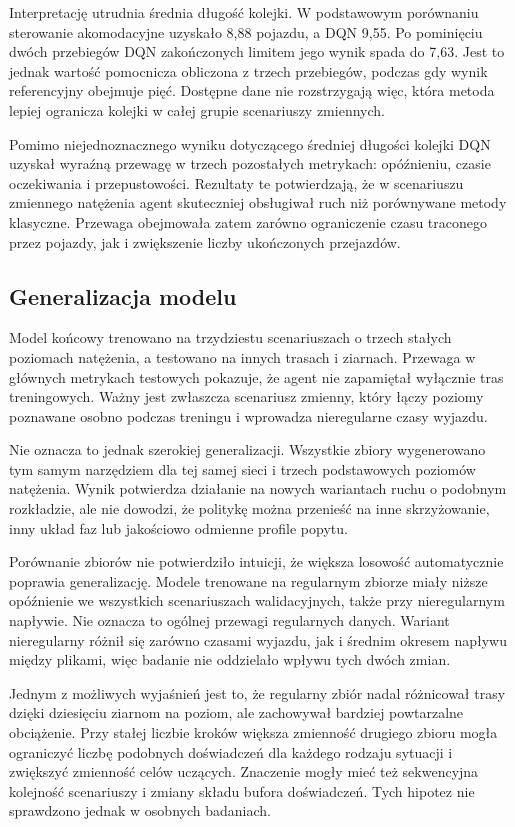Interpretację utrudnia średnia długość kolejki. W podstawowym porównaniu sterowanie akomodacyjne uzyskało 8,88 pojazdu, a DQN 9,55. Po pominięciu dwóch przebiegów DQN zakończonych limitem jego wynik spada do 7,63. Jest to jednak wartość pomocnicza obliczona z trzech przebiegów, podczas gdy wynik referencyjny obejmuje pięć. Dostępne dane nie rozstrzygają więc, która metoda lepiej ogranicza kolejki w całej grupie scenariuszy zmiennych.

Pomimo niejednoznacznego wyniku dotyczącego średniej długości kolejki DQN uzyskał wyraźną przewagę w trzech pozostałych metrykach: opóźnieniu, czasie oczekiwania i przepustowości. Rezultaty te potwierdzają, że w scenariuszu zmiennego natężenia agent skuteczniej obsługiwał ruch niż porównywane metody klasyczne. Przewaga obejmowała zatem zarówno ograniczenie czasu traconego przez pojazdy, jak i zwiększenie liczby ukończonych przejazdów.

\subsection{Generalizacja modelu}
\label{subsec:analiza-generalizacji}

Model końcowy trenowano na trzydziestu scenariuszach o trzech stałych poziomach natężenia, a testowano na innych trasach i ziarnach. Przewaga w głównych metrykach testowych pokazuje, że agent nie zapamiętał wyłącznie tras treningowych. Ważny jest zwłaszcza scenariusz zmienny, który łączy poziomy poznawane osobno podczas treningu i wprowadza nieregularne czasy wyjazdu.

Nie oznacza to jednak szerokiej generalizacji. Wszystkie zbiory wygenerowano tym samym narzędziem dla tej samej sieci i trzech podstawowych poziomów natężenia. Wynik potwierdza działanie na nowych wariantach ruchu o podobnym rozkładzie, ale nie dowodzi, że politykę można przenieść na inne skrzyżowanie, inny układ faz lub jakościowo odmienne profile popytu.

Porównanie zbiorów nie potwierdziło intuicji, że większa losowość automatycznie poprawia generalizację. Modele trenowane na regularnym zbiorze miały niższe opóźnienie we wszystkich scenariuszach walidacyjnych, także przy nieregularnym napływie. Nie oznacza to ogólnej przewagi regularnych danych. Wariant nieregularny różnił się zarówno czasami wyjazdu, jak i średnim okresem napływu między plikami, więc badanie nie oddzielało wpływu tych dwóch zmian.

Jednym z możliwych wyjaśnień jest to, że regularny zbiór nadal różnicował trasy dzięki dziesięciu ziarnom na poziom, ale zachowywał bardziej powtarzalne obciążenie. Przy stałej liczbie kroków większa zmienność drugiego zbioru mogła ograniczyć liczbę podobnych doświadczeń dla każdego rodzaju sytuacji i zwiększyć zmienność celów uczących. Znaczenie mogły mieć też sekwencyjna kolejność scenariuszy i zmiany składu bufora doświadczeń. Tych hipotez nie sprawdzono jednak w osobnych badaniach.

